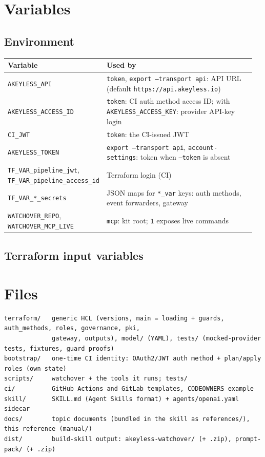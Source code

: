 \chapter{Variables}\label{app:env}
\section{Environment}
{\small
\begin{longtable}{@{}>{\raggedright\arraybackslash}p{0.34\linewidth}>{\raggedright\arraybackslash}p{0.62\linewidth}@{}}
\toprule
\textbf{Variable} & \textbf{Used by} \\ \midrule\endhead
\texttt{AKEYLESS\_API} & \texttt{token}, \texttt{export --transport api}: API URL (default \texttt{https://api.akeyless.io}) \\
\texttt{AKEYLESS\_ACCESS\_ID} & \texttt{token}: CI auth method access ID; with \texttt{AKEYLESS\_ACCESS\_KEY}: provider API-key login \\
\texttt{CI\_JWT} & \texttt{token}: the CI-issued JWT \\
\texttt{AKEYLESS\_TOKEN} & \texttt{export --transport api}, \texttt{account-settings}: token when \texttt{--token} is absent \\
\texttt{TF\_VAR\_pipeline\_jwt}, \texttt{TF\_VAR\_pipeline\_access\_id} & Terraform login (CI) \\
\texttt{TF\_VAR\_*\_secrets} & JSON maps for \texttt{*\_var} keys: auth methods, event forwarders, gateway \\
\texttt{WATCHOVER\_REPO}, \texttt{WATCHOVER\_MCP\_LIVE} & \texttt{mcp}: kit root; \texttt{1} exposes live commands \\
\bottomrule
\end{longtable}}
\section{Terraform input variables}


\chapter{Files}\label{app:files}
\begin{lstlisting}
terraform/   generic HCL (versions, main = loading + guards, auth_methods, roles, governance, pki,
             gateway, outputs), model/ (YAML), tests/ (mocked-provider tests, fixtures, guard proofs)
bootstrap/   one-time CI identity: OAuth2/JWT auth method + plan/apply roles (own state)
scripts/     watchover + the tools it runs; tests/
ci/          GitHub Actions and GitLab templates, CODEOWNERS example
skill/       SKILL.md (Agent Skills format) + agents/openai.yaml sidecar
docs/        topic documents (bundled in the skill as references/), this reference (manual/)
dist/        build-skill output: akeyless-watchover/ (+ .zip), prompt-pack/ (+ .zip)
\end{lstlisting}

